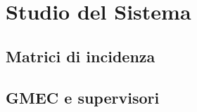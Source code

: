 \chapter{Studio del Sistema}
\label{cap:cap4}
\lhead{\textbf{\rightmark}}

\newpage

\section{Matrici di incidenza}
\label{sec:4.1}

\newpage

\section{GMEC e supervisori}
\label{sec:4.2}

\newpage
